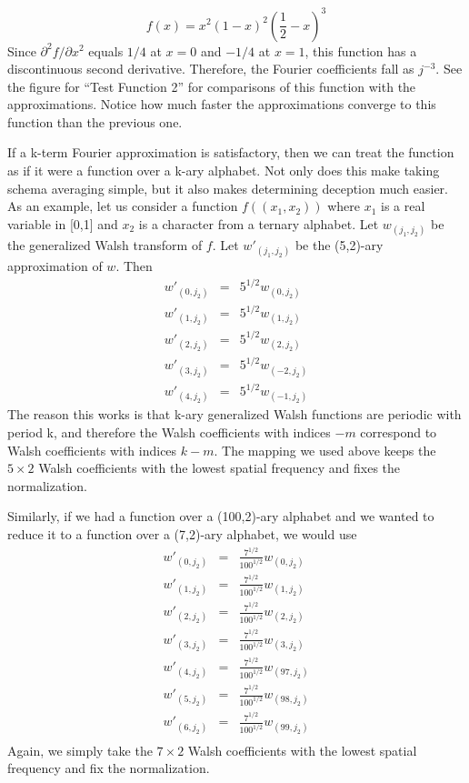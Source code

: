 \begin{equation}
f(x)=x^2(1-x)^2 (\frac{1}{2}-x)^3
\end{equation}
Since $\partial^2 f/\partial x^2$ equals $1/4$ at $x=0$ and $-1/4$ at $x=1$,
this function has a discontinuous second derivative.  Therefore, the
Fourier coefficients fall as $j^{-3}$.  See the figure for ``Test Function 2''
for comparisons of this function with the approximations.  Notice how
much faster the approximations converge to this function than the previous
one.

If a k-term Fourier approximation is satisfactory, then we can treat
the function as if it were a function over a k-ary alphabet.  Not only
does this make taking schema averaging simple, but it also makes
determining deception much easier.  As an example, let us consider a
function $f((x_1,x_2))$ where $x_1$ is a real variable in [0,1] and
$x_2$ is a character from a ternary alphabet.  Let $w_{(j_1,j_2)}$ be
the generalized Walsh transform of $f$.  Let $w'_{(j_1,j_2)}$ be the
(5,2)-ary approximation of $w$.  Then
\begin{eqnarray}
w'_{(0,j_2)} &=& 5^{1/2} w_{(0,j_2)} \nonumber \\
w'_{(1,j_2)} &=& 5^{1/2} w_{(1,j_2)} \nonumber \\
w'_{(2,j_2)} &=& 5^{1/2} w_{(2,j_2)} \nonumber \\
w'_{(3,j_2)} &=& 5^{1/2} w_{(-2,j_2)} \nonumber \\
w'_{(4,j_2)} &=& 5^{1/2} w_{(-1,j_2)}
\end{eqnarray}
The reason this works is that k-ary generalized Walsh functions are
periodic with period k, and therefore the Walsh coefficients with indices
$-m$ correspond to Walsh coefficients with indices $k-m$.  The mapping
we used above keeps the $5\times 2$ Walsh coefficients with the lowest spatial
frequency and fixes the normalization.

Similarly, if we had a function over a (100,2)-ary alphabet and we wanted
to reduce it to a function over a (7,2)-ary alphabet, we would use
\begin{eqnarray}
w'_{(0,j_2)} &=& \frac{7^{1/2}}{100^{1/2}} w_{(0,j_2)} \nonumber \\
w'_{(1,j_2)} &=& \frac{7^{1/2}}{100^{1/2}} w_{(1,j_2)} \nonumber \\
w'_{(2,j_2)} &=& \frac{7^{1/2}}{100^{1/2}} w_{(2,j_2)} \nonumber \\
w'_{(3,j_2)} &=& \frac{7^{1/2}}{100^{1/2}} w_{(3,j_2)} \nonumber \\
w'_{(4,j_2)} &=& \frac{7^{1/2}}{100^{1/2}} w_{(97,j_2)} \nonumber \\
w'_{(5,j_2)} &=& \frac{7^{1/2}}{100^{1/2}} w_{(98,j_2)} \nonumber \\
w'_{(6,j_2)} &=& \frac{7^{1/2}}{100^{1/2}} w_{(99,j_2)} \nonumber \\
\end{eqnarray}
Again, we simply take the $7\times 2$ Walsh coefficients with the lowest spatial
frequency and fix the normalization.

